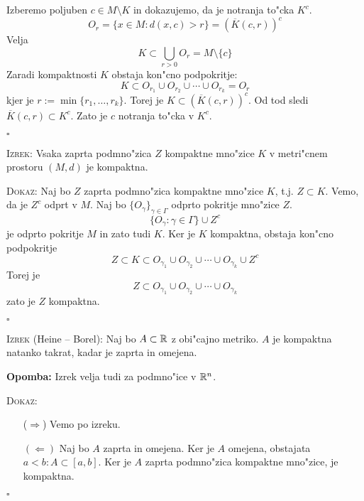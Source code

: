 Izberemo poljuben $c \in M \setminus K$ in dokazujemo, da je notranja to"cka $K^c$.
\begin{equation*}
O_r = \{ x \in M: d(x, c) > r \} = \left( \overline{K}(c, r) \right)^c
\end{equation*}
Velja
\begin{equation*}
K \subset \bigcup_{r > 0} O_r = M \setminus \{ c \}
\end{equation*}
Zaradi kompaktnosti $K$ obstaja kon"cno podpokritje:
\begin{equation*}
K \subset O_{r_1} \cup O_{r_2} \cup \cdots \cup O_{r_k} = O_r
\end{equation*}
kjer je $r := \min \{ r_1, \ldots, r_k \}$. Torej je $K \subset \left( \overline{K}(c, r) \right)^c$. Od tod sledi $\overline{K}(c, r) \subset K^c$. Zato je $c$ notranja to"cka v $K^c$.

\hfill $\square$

\textsc{Izrek:} Vsaka zaprta podmno"zica $Z$ kompaktne mno"zice $K$ v metri"cnem prostoru $(M, d)$ je kompaktna.

\textsc{Dokaz:} Naj bo $Z$ zaprta podmno"zica kompaktne mno"zice $K$, t.j. $Z \subset K$. Vemo, da je $Z^c$ odprt v $M$. Naj bo $\{ O_\gamma \}_{\gamma \in \Gamma}$ odprto pokritje mno"zice $Z$.
\begin{equation*}
\{ O_\gamma: \gamma \in \Gamma \} \cup Z^c
\end{equation*}
je odprto pokritje $M$ in zato tudi $K$. Ker je $K$ kompaktna, obstaja kon"cno podpokritje
\begin{equation*}
Z \subset K \subset O_{\gamma_1} \cup O_{\gamma_2} \cup \cdots \cup O_{\gamma_k} \cup Z^c
\end{equation*}
Torej je
\begin{equation*}
Z \subset O_{\gamma_1} \cup O_{\gamma_2} \cup \cdots \cup O_{\gamma_k}
\end{equation*}
zato je $Z$ kompaktna.

\hfill $\square$

\textsc{Izrek} (Heine -- Borel): Naj bo $A \subset \mathbb{R}$ z obi"cajno metriko. $A$ je kompaktna natanko takrat, kadar je zaprta in omejena.

\textbf{Opomba:} Izrek velja tudi za podmno"ice v $\mathbb{R}^n$.

\textsc{Dokaz:}
\begin{itemize}
    \item[($\Rightarrow$)] Vemo po izreku.
    \item[$(\Leftarrow)$] Naj bo $A$ zaprta in omejena. Ker je $A$ omejena, obstajata $a < b: A \subset [a, b]$. Ker je $A$ zaprta podmno"zica kompaktne mno"zice, je kompaktna.
\end{itemize}
\hfill $\square$

